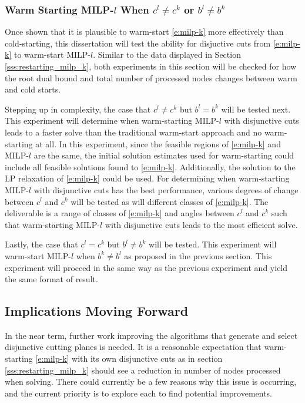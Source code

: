 \documentclass[10pt]{article}
\begin{document}
	\subsubsection{Warm Starting MILP-\boldmath\texorpdfstring{$ l $}{l} When \boldmath\texorpdfstring{$ c^l \neq c^k $}{cl not equal ck} or \boldmath\texorpdfstring{$ b^l \neq b^k$}{bl not equal bk}} \label{sss:warm_starting_milp_l}
	
	Once shown that it is plausible to warm-start \ref{e:milp-k} more effectively than cold-starting, this dissertation will test the ability for disjuctive cuts from \ref{e:milp-k} to warm-start MILP-$ l $. Similar to the data displayed in Section \ref{sss:restarting_milp_k}, both experiments in this section will be checked for how the root dual bound and total number of processed nodes changes between warm and cold starts.
	
	Stepping up in complexity, the case that $ c^l \neq c^k $ but $ b^l = b^k $ will be tested next. This experiment will determine when warm-starting MILP-$ l $ with disjunctive cuts leads to a faster solve than the traditional warm-start approach and no warm-starting at all. In this experiment, since the feasible regions of \ref{e:milp-k} and MILP-$ l $ are the same, the initial solution estimates used for warm-starting could include all feasible solutions found to \ref{e:milp-k}. Additionally, the solution to the LP relaxation of \ref{e:milp-k} could be used. For determining when warm-starting MILP-$ l $ with disjunctive cuts has the best performance, various degrees of change between $ c^l $ and $ c^k $ will be tested as will different classes of \ref{e:milp-k}. The deliverable is a range of classes of \ref{e:milp-k} and angles between $ c^l $ and $ c^k $ such that warm-starting MILP-$ l $ with disjunctive cuts leads to the most efficient solve.
	
	Lastly, the case that $ c^l = c^k $ but $ b^l \neq b^k $ will be tested. This experiment will warm-start MILP-$ l $ when $ b^k \neq b^l $ as proposed in the previous section. This experiment will proceed in the same way as the previous experiment and yield the same format of result.
	
	\subsection{Implications Moving Forward} \label{ss:implications}
	In the near term, further work improving the algorithms that generate and select disjunctive cutting planes is needed. It is a reasonable expectation that warm-starting \ref{e:milp-k} with its own disjunctive cuts as in section \ref{sss:restarting_milp_k} should see a reduction in number of nodes processed when solving. There could currently be a few reasons why this issue is occurring, and the current priority is to explore each to find potential improvements.
	
\end{document}
